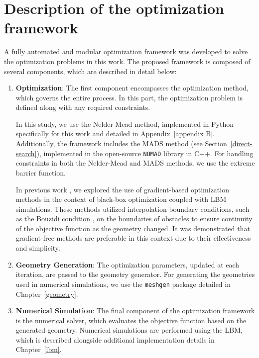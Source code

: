 \section{Description of the optimization framework}\label{framework}
A fully automated and modular optimization framework was developed to solve the optimization problems in this work. The proposed framework is composed of several components, which are described in detail below:

\begin{enumerate}
	\item \textbf{Optimization}:  
	The first component encompasses the optimization method, which governs the entire process. In this part, the optimization problem is defined along with any required constraints.
	
	In this study, we use the Nelder-Mead method, implemented in Python specifically for this work and detailed in Appendix~\ref{appendix B}. Additionally, the framework includes the MADS method (see Section~\ref{direct-search}), implemented in the open-source \texttt{NOMAD} library \cite{nomad} in C++. For handling constraints in both the Nelder-Mead and MADS methods, we use the extreme barrier function.
	
	In previous work \cite{buresBP, buresVU}, we explored the use of gradient-based optimization methods in the context of black-box optimization coupled with LBM simulations. These methods utilized interpolation boundary conditions, such as the Bouzidi condition \cite{Bouzidi2001}, on the boundaries of obstacles to ensure continuity of the objective function as the geometry changed. It was demonstrated that gradient-free methods are preferable in this context due to their effectiveness and simplicity.

	
	\item \textbf{Geometry Generation}:  
	The optimization parameters, updated at each iteration, are passed to the geometry generator. For generating the geometries used in numerical simulations, we use the \texttt{meshgen} package detailed in Chapter~\ref{geometry}.
	
	\item \textbf{Numerical Simulation}:  
	The final component of the optimization framework is the numerical solver, which evaluates the objective function based on the generated geometry. Numerical simulations are performed using the LBM, which is described alongside additional implementation details in Chapter~\ref{lbm}.
\end{enumerate}

